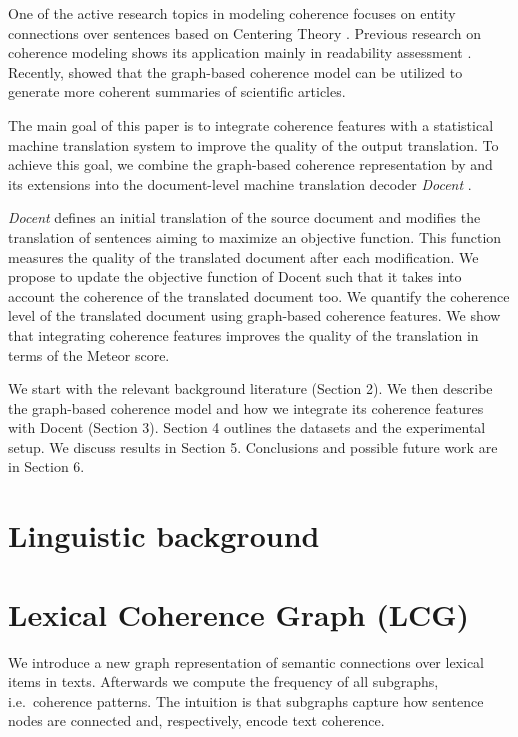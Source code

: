One of the active research topics in modeling coherence focuses on entity connections over sentences based on Centering Theory \cite{Grosz1995}. 
Previous research on coherence modeling shows its application mainly in readability assessment \cite{Barzilay2008, Pitler2008}. Recently,  showed that the graph-based coherence model can be utilized to generate more coherent summaries of scientific articles. 

The main goal of this paper is to integrate coherence features with a statistical machine translation system to improve the quality of the output translation. To achieve this goal, we combine the graph-based coherence representation by 
 and its extensions \cite{Mesgar2015, Mesgar2016} into the document-level machine translation decoder \textit{Docent} \cite{Hardmeier2012a, Hardmeier2013a}.

\emph{Docent} defines an initial translation of the source document and modifies the translation of sentences aiming to maximize an objective function. This function measures the quality of the translated document after each modification. We propose to update the objective function of Docent such that it takes into account the coherence of the translated document too. We quantify the coherence level of the translated document using graph-based coherence features. We show that integrating coherence features improves the quality of the translation in terms of the Meteor score.

We start with the relevant background literature (Section 2). 
We then describe the graph-based coherence model and how we integrate its coherence features with Docent (Section 3). Section 4 outlines the datasets and the experimental setup. 
We discuss results in Section 5. Conclusions and possible future work are in Section 6.


\section{Linguistic background}
\label{sec:linguistic_background}

\section{Lexical Coherence Graph (LCG)}
\label{sec:lexical_coherence_graph}
%
We introduce a new graph representation of semantic connections over
lexical items in texts. Afterwards we compute the frequency of all
subgraphs, i.e.\ coherence patterns. The intuition is that subgraphs
capture how sentence nodes are connected and, respectively,
encode text coherence.


